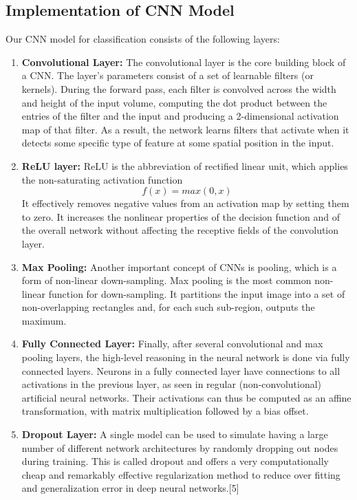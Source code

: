 \documentclass[12pt]{article}
\begin{document}
\subsection{Implementation of CNN Model}
\label{sec:model_def}
Our CNN model for classification consists of the following layers: 
\begin{enumerate}
	\item {\textbf{Convolutional Layer:}} The convolutional layer is the core building block of a CNN. The layer's parameters consist of a set of learnable filters (or kernels). During the forward pass, each filter is convolved across the width and height of the input volume, computing the dot product between the entries of the filter and the input and producing a 2-dimensional activation map of that filter. As a result, the network learns filters that activate when it detects some specific type of feature at some spatial position in the input.
	
	\item {\textbf{ReLU layer:}} ReLU is the abbreviation of rectified linear unit, which applies the non-saturating activation function 
\begin{equation}	
	f(x)=max(0, x)
\end{equation} It effectively removes negative values from an activation map by setting them to zero. It increases the nonlinear properties of the decision function and of the overall network without affecting the receptive fields of the convolution layer. 

	\item {\textbf{Max Pooling:}} Another important concept of CNNs is pooling, which is a form of non-linear down-sampling. Max pooling is the most common non-linear function for down-sampling. It partitions the input image into a set of non-overlapping rectangles and, for each such sub-region, outputs the maximum. 
	
	\item \textbf{Fully Connected Layer:} Finally, after several convolutional and max pooling layers, the high-level reasoning in the neural network is done via fully connected layers. Neurons in a fully connected layer have connections to all activations in the previous layer, as seen in regular (non-convolutional) artificial neural networks. Their activations can thus be computed as an affine transformation, with matrix multiplication followed by a bias offset. 
	
	\item \textbf{Dropout Layer:} A single model can be used to simulate having a large number of different network architectures by randomly dropping out nodes during training. This is called dropout and offers a very computationally cheap and remarkably effective regularization method to reduce over fitting and generalization error in deep neural networks.[5]

\end{enumerate}
\end{document}
